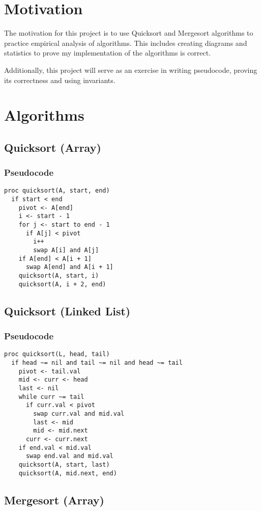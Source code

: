 \documentclass[a4paper,12pt]{article}
\begin{document}
\section{Motivation}

The motivation for this project is to use Quicksort and Mergesort algorithms to practice empirical analysis of algorithms.
This includes creating diagrams and statistics to prove my implementation of the algorithms is correct.

Additionally, this project will serve as an exercise in writing pseudocode, proving its correctness and using invariants.

\section{Algorithms}
\subsection{Quicksort (Array)}
\subsubsection{Pseudocode}
\begin{verbatim}
proc quicksort(A, start, end)
  if start < end
    pivot <- A[end]
    i <- start - 1 
    for j <- start to end - 1
      if A[j] < pivot
        i++
        swap A[i] and A[j]
    if A[end] < A[i + 1]
      swap A[end] and A[i + 1]
    quicksort(A, start, i)
    quicksort(A, i + 2, end)
\end{verbatim}
\subsection{Quicksort (Linked List)}
\subsubsection{Pseudocode}
\begin{verbatim}
proc quicksort(L, head, tail)
  if head ~= nil and tail ~= nil and head ~= tail
    pivot <- tail.val
    mid <- curr <- head
    last <- nil
    while curr ~= tail
      if curr.val < pivot
        swap curr.val and mid.val
        last <- mid
        mid <- mid.next
      curr <- curr.next
    if end.val < mid.val
      swap end.val and mid.val
    quicksort(A, start, last)
    quicksort(A, mid.next, end)
\end{verbatim}
\subsection{Mergesort (Array)}
\end{document}

